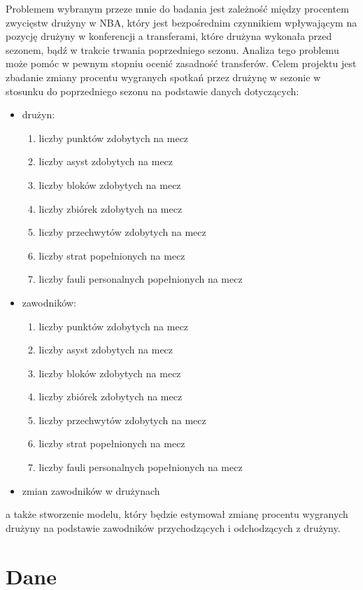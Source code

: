 \documentclass{article}
\begin{document}
Problemem wybranym przeze mnie do badania jest zależność między procentem zwycięstw drużyny w NBA, który jest bezpośrednim czynnikiem wpływającym na pozycję drużyny w konferencji a transferami, które drużyna wykonała przed sezonem, bądź w trakcie trwania poprzedniego sezonu.  Analiza tego problemu może pomóc w pewnym stopniu ocenić zasadność transferów. Celem projektu jest zbadanie zmiany procentu wygranych spotkań przez drużynę w sezonie w stosunku do poprzedniego sezonu na podstawie danych dotyczących:
\begin{itemize}
    \item drużyn: \begin{enumerate}
        \item liczby punktów zdobytych na mecz
        \item liczby asyst zdobytych na mecz
        \item liczby bloków zdobytych na mecz
        \item liczby zbiórek zdobytych na mecz
        \item liczby przechwytów zdobytych na mecz
        \item liczby strat popełnionych na mecz
        \item liczby fauli personalnych popełnionych na mecz
    \end{enumerate}
    \item zawodników: \begin{enumerate}
        \item liczby punktów zdobytych na mecz
        \item liczby asyst zdobytych na mecz
        \item liczby bloków zdobytych na mecz
        \item liczby zbiórek zdobytych na mecz
        \item liczby przechwytów zdobytych na mecz
        \item liczby strat popełnionych na mecz
        \item liczby fauli personalnych popełnionych na mecz
    \end{enumerate}
    \item zmian zawodników w drużynach
\end{itemize} a także stworzenie modelu, który będzie estymował zmianę procentu wygranych drużyny na podstawie zawodników przychodzących i odchodzących z drużyny.


\section{Dane}
\end{document}
